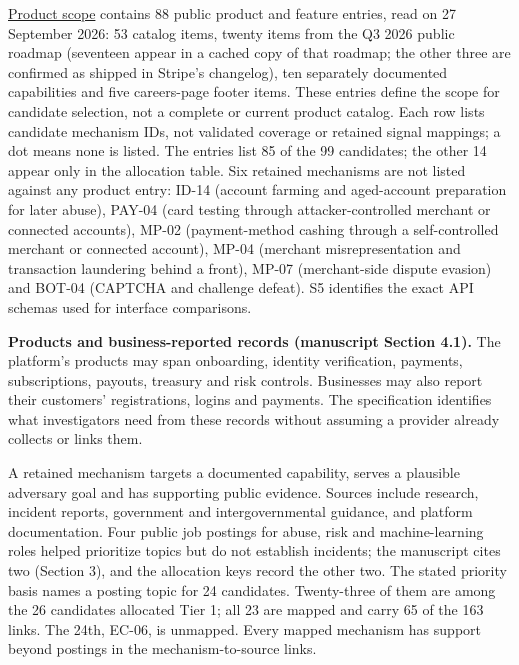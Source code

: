 \documentclass[
  11pt,
]{article}
\begin{document}
\suppressfloats[t]

\href{SUPPLEMENT/S2_SURFACE_BASELINE.csv}{Product scope} contains 88
public product and feature entries, read on 27 September 2026: 53
catalog items, twenty items from the Q3 2026 public roadmap (seventeen
appear in a cached copy of that roadmap; the other three are confirmed
as shipped in Stripe's changelog), ten separately documented
capabilities and five careers-page footer items. These entries define
the scope for candidate selection, not a complete or current product
catalog. Each row lists candidate mechanism IDs, not validated coverage
or retained signal mappings; a dot means none is listed. The entries
list 85 of the 99 candidates; the other 14 appear only in the allocation
table. Six retained mechanisms are not listed against any product entry:
\mbox{ID-14} (account farming and aged-account preparation for later
abuse), \mbox{PAY-04} (card testing through attacker-controlled merchant
or connected accounts), \mbox{MP-02} (payment-method cashing through a
self-controlled merchant or connected account), \mbox{MP-04} (merchant
misrepresentation and transaction laundering behind a front),
\mbox{MP-07} (merchant-side dispute evasion) and \mbox{BOT-04} (CAPTCHA
and challenge defeat). S5 identifies the exact API schemas used for
interface comparisons.

\textbf{Products and business-reported records (manuscript Section
4.1).} The platform's products may span onboarding, identity
verification, payments, subscriptions, payouts, treasury and risk
controls. Businesses may also report their customers' registrations,
logins and payments. The specification identifies what investigators
need from these records without assuming a provider already collects or
links them.

A retained mechanism targets a documented capability, serves a plausible
adversary goal and has supporting public evidence. Sources include
research, incident reports, government and intergovernmental guidance,
and platform documentation. Four public job postings for abuse, risk and
machine-learning roles helped prioritize topics but do not establish
incidents; the manuscript cites two (Section 3), and the allocation keys
record the other two. The stated priority basis names a posting topic
for 24 candidates. Twenty-three of them are among the 26 candidates
allocated Tier 1; all 23 are mapped and carry 65 of the 163 links. The
24th, \mbox{EC-06}, is unmapped. Every mapped mechanism has support
beyond postings in the mechanism-to-source links.
\end{document}

